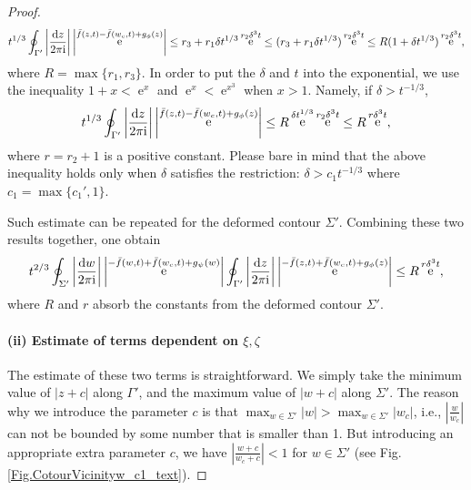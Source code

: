 \documentclass[cmp]{svjour}
\numberwithin{theorem}{section}
\numberwithin{equation}{section}
\DeclareMathOperator{\e}{e}
\def\dd{{\rm d}}
\def\ii{{\rm i}}
\begin{document}
\begin{proof}
\begin{equation*}
\begin{split}
		t^{1/3} \oint_{\Gamma'} \left|\frac{\dd z }{2 \pi \ii}\right|	\left| \e^{\bar{f}(z,t)-\bar{f}(w_c,t) + g_{\phi}(z)} \right| \leq r_3+r_1 \delta t^{1/3} \e^{r_2 \delta^3 t} \leq
		(r_3+r_1 \delta t^{1/3})\e^{r_2 \delta^3 t}  \leq R(1 + \delta t^{1/3})\e^{r_2 \delta^3 t},
	\end{split}
\end{equation*}
where $R = \max\{r_1,r_3\}$. In order to put the $\delta$ and $t$ into the exponential, we use the inequality $1 + x <\e^{x} $ and $\e^x<\e^{x^3}$ when $x>1$. Namely, if $\delta > t^{-1/3}$, 
\begin{equation*}
	\begin{split}
		t^{1/3} \oint_{\Gamma'} \left|\frac{\dd z }{2 \pi \ii}\right|	\left| \e^{\bar{f}(z,t)-\bar{f}(w_c,t) + g_{\phi}(z)} \right| \leq R \e^{\delta t^{1/3}} \e^{r_2 \delta^3 t} \leq R\e^{r \delta^3 t},
	\end{split}
\end{equation*}
where $r=r_2+1$ is a positive constant.
Please bare in mind that the above inequality holds only when $\delta$ satisfies the restriction: $\delta > c_1 t^{-1/3}$ where $c_1 = \max\{c_1',1\}$. 

Such estimate can be repeated for the deformed contour $\Sigma'$. Combining these two results together, one obtain
\begin{equation}\label{fbarBoundTotal}
	\begin{split}
		t^{2/3} \oint_{\Sigma'} \left|\frac{\dd w }{2 \pi \ii}\right|	\left| \e^{-\bar{f}(w,t)+\bar{f}(w_c,t) + g_{\psi}(w)} \right| \oint_{\Gamma'} \left|\frac{\dd z }{2 \pi \ii}\right|	\left| \e^{-\bar{f}(z,t)+\bar{f}(w_c,t) + g_{\phi}(z)} \right|  \leq R\e^{r \delta^3 t},
	\end{split}
\end{equation} 
where $R$ and $r$ absorb the constants from the deformed contour $\Sigma'$. 


\paragraph{(ii) Estimate of terms dependent on $\xi,\zeta$} The estimate of these two terms is straightforward. We simply take the minimum value of $|z+c|$ along $\Gamma'$, and the maximum value of $|w+c|$ along $\Sigma'$. The reason why we introduce the parameter $c$ is that $\max_{w\in \Sigma'}|w| > \max_{w\in \Sigma'}|w_c|$, i.e., $|\frac{w}{w_c}|$ can not be bounded by some number that is smaller than 1. But introducing an appropriate extra parameter $c$, we have $|\frac{w+c}{w_c+c}|<1$ for $w \in \Sigma'$ (see Fig. \ref{Fig.CotourVicinityw_c1_text}).


\end{proof}
\end{document}
